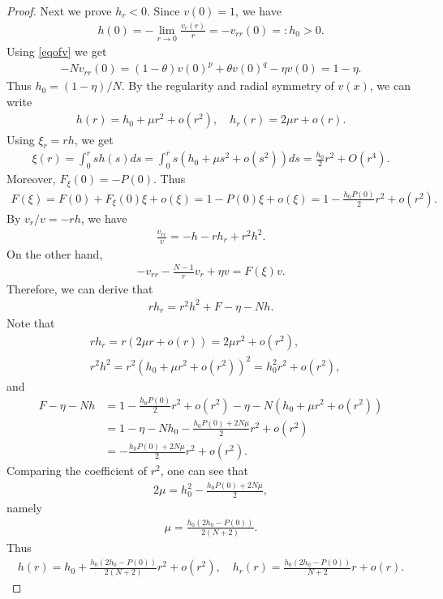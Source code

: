 \documentclass{article}
\theoremstyle{definition} \theoremstyle{remark}
\numberwithin{equation}{section}
\begin{document}
\begin{proof}
		Next we prove $h_r < 0$. Since $v(0) = 1$, we have
		\begin{align*}
			h(0) = - \lim_{r \to 0}\frac{v_r(r)}{r} = -v_{rr}(0) =: h_0 > 0.
		\end{align*}
		Using \eqref{eqofv} we get
		\begin{align*}
			-N v_{rr}(0) = (1-\theta)v(0)^{p} + \theta v(0)^{q} - \eta v(0) = 1 - \eta.
		\end{align*}
		Thus $h_0 = (1-\eta)/N$. By the regularity and radial symmetry of $v(x)$, we can write
		\begin{align*}
			h(r) = h_0 + \mu r^2 + o(r^2), \quad h_r(r) = 2\mu r + o(r).
		\end{align*}
		Using $\xi_r = rh$, we get
		\begin{align*}
			\xi(r) = \int_0^r sh(s)ds = \int_0^r s\left(h_0 + \mu s^2 + o(s^2)\right)ds = \frac{h_0}{2}r^2 + O(r^4).
		\end{align*}
		Moreover, $F_\xi(0) = -P(0)$. Thus
		\begin{align*}
			F(\xi) = F(0) + F_\xi(0)\xi + o(\xi) = 1 - P(0)\xi  + o(\xi) = 1 - \frac{h_0P(0)}{2}r^2 + o(r^2).
		\end{align*}
		By $v_r/v = -rh$, we have
		\begin{align*}
			\frac{v_{rr}}{v} = -h - rh_r + r^2h^2.
		\end{align*}
		On the other hand,
		\begin{align*}
			-v_{rr} - \frac{N-1}{r}v_r + \eta v = F(\xi)v.
		\end{align*}
		Therefore, we can derive that
		\begin{align} \label{eqofh_r}
			rh_r = r^2h^2 + F -\eta - Nh.
		\end{align}
		Note that
		\begin{align*}
			& rh_r = r(2\mu r + o(r)) = 2\mu r^2 + o(r^2), \\
			& r^2h^2 = r^2(h_0 + \mu r^2 + o(r^2))^2 = h_0^2 r^2 + o(r^2),
		\end{align*}
		and
		\begin{align*}
			F - \eta - Nh & = 1 - \frac{h_0P(0)}{2}r^2 + o(r^2) - \eta - N (h_0 + \mu r^2 + o(r^2)) \\
			& = 1 - \eta - Nh_0 - \frac{h_0P(0) + 2N\mu}{2}r^2 + o(r^2) \\
			& = - \frac{h_0P(0) + 2N\mu}{2}r^2 + o(r^2).
		\end{align*}
		Comparing the coefficient of $r^2$, one can see that
		\begin{align*}
			2\mu = h_0^2 - \frac{h_0P(0) + 2N\mu}{2},
		\end{align*}
		namely
		\begin{align*}
			\mu = \frac{h_0(2h_0 - P(0))}{2(N+2)}.
		\end{align*}
		Thus
		\begin{align} \label{eqextending}
			h(r) = h_0 + \frac{h_0(2h_0 - P(0))}{2(N+2)} r^2 + o(r^2), \quad h_r(r) = \frac{h_0(2h_0 - P(0))}{N+2} r + o(r).
		\end{align}


\end{proof}
\end{document}
